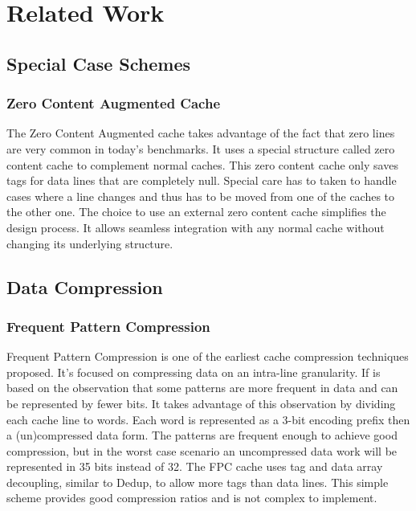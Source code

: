 
\chapter{Related Work}
\label{ch:Related Work}

\section{Special Case Schemes}
\subsection{Zero Content Augmented Cache}
The Zero Content Augmented\cite{zca} cache takes advantage of the fact that zero lines are very common in today's benchmarks. It uses a special structure called zero content cache to complement normal caches. This zero content cache only saves tags for data lines that are completely null. Special care has to taken to handle cases where a line changes and thus has to be moved from one of the caches to the other one. The choice to use an external zero content cache simplifies the design process. It allows seamless integration with any normal cache without changing its underlying structure.

\section{Data Compression}
\subsection{Frequent Pattern Compression}
\label{ssec:FPC}
Frequent Pattern Compression\cite{fpc} is one of the earliest cache compression techniques proposed. It's focused on compressing data on an intra-line granularity. If is based on the observation that some patterns are more frequent in data and can be represented by fewer bits. It takes advantage of this observation by dividing each cache line to words. Each word is represented as a 3-bit encoding prefix then a (un)compressed data form. The patterns are frequent enough to achieve good compression, but in the worst case scenario an uncompressed data work will be represented in 35 bits instead of 32. The FPC cache uses tag and data array decoupling, similar to Dedup, to allow more tags than data lines. This simple scheme provides good compression ratios and is not complex to implement.
